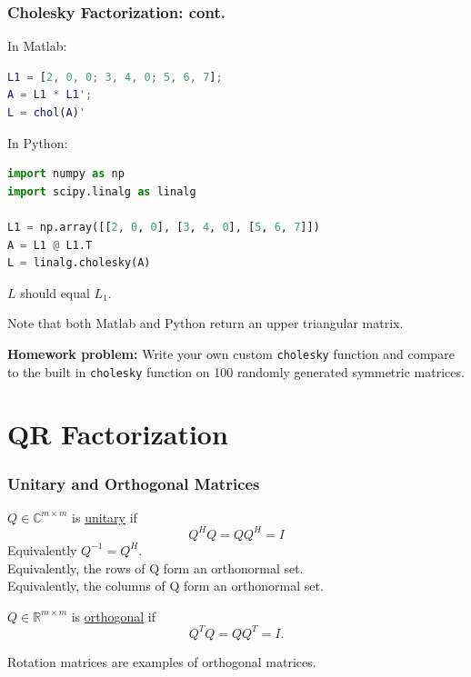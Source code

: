 \documentclass{beamer}
\begin{document}
\begin{frame}[fragile]\frametitle{Cholesky Factorization: cont.}
In Matlab:
	
\begin{lstlisting}[language=Matlab]
L1 = [2, 0, 0; 3, 4, 0; 5, 6, 7];
A = L1 * L1';
L = chol(A)'	
\end{lstlisting}

\vfill
	
In Python:

\begin{lstlisting}[language=Python]
import numpy as np
import scipy.linalg as linalg
		
L1 = np.array([[2, 0, 0], [3, 4, 0], [5, 6, 7]])
A = L1 @ L1.T
L = linalg.cholesky(A)
\end{lstlisting}	

$L$ should equal $L_1$.

\vfill

Note that both Matlab and Python return an upper triangular matrix.

\vfill

{\bf Homework problem:}  Write your own custom \texttt{cholesky} function and compare to the built in \texttt{cholesky} function on 100 randomly generated symmetric matrices.
\end{frame}


\section{QR Factorization}
\frame{\sectionpage}

\begin{frame}\frametitle{Unitary and Orthogonal Matrices}
	\begin{definition}
	$Q \in \mathbb{C}^{m\times m}$ is \underline{unitary} if
	\[ 
		Q^HQ = QQ^H = I 
	\]
	Equivalently $Q^{-1} = Q^H$.  \\
	Equivalently, the rows of Q form an orthonormal set. \\
	Equivalently, the columns of Q form an orthonormal set.
	\end{definition}

	\begin{definition}
	$Q \in \mathbb{R}^{m \times m} $ is \underline{orthogonal} if 
	\[ 
		Q^TQ = QQ^T = I.
	\]
	\end{definition}
	
	\vfill
	
	Rotation matrices are examples of orthogonal matrices.
\end{frame}
\end{document}
